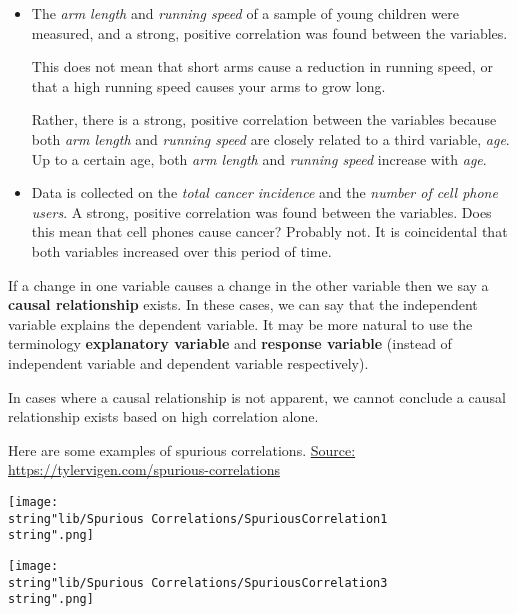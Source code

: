 \documentclass[11pt,a4paper]{book}
\begin{document}
\begin{itemize}

\item  The \textit{arm length} and \textit{running speed} of a sample
of young children were measured, and a strong, positive correlation
was found between the variables.

This does not mean that short arms cause a reduction in running speed,
or that a high running speed causes your arms to grow long.

Rather, there is a strong, positive correlation between the variables
because both \textit{arm length} and \textit{running speed} are closely
related to a third variable, \textit{age}. Up to a certain age, both
\textit{arm length} and \textit{running speed} increase with \textit{age}.

\item  Data is collected on the \textit{total cancer incidence} and
the \textit{number of cell phone users}. A strong, positive correlation
was found between the variables. Does this mean that cell phones cause
cancer? Probably not. It is coincidental that both variables increased
over this period of time.

\end{itemize}

If a change in one variable causes a change in the other variable
then we say a \textbf{causal relationship} exists. In these cases,
we can say that the independent variable explains the dependent variable.
It may be more natural to use the terminology \textbf{explanatory
variable} and \textbf{response variable} (instead of independent variable
and dependent variable respectively).

In cases where a causal relationship is not apparent, we cannot conclude
a causal relationship exists based on high correlation alone.

Here are some examples of spurious correlations. \href{https://tylervigen.com/spurious-correlations}{Source: https://tylervigen.com/spurious-correlations}
\begin{center}
\texttt{[image: \\string"lib/Spurious Correlations/SpuriousCorrelation1\\string".png]}
\par\end{center}


\begin{center}
\texttt{[image: \\string"lib/Spurious Correlations/SpuriousCorrelation3\\string".png]}
\par\end{center}
\end{document}
